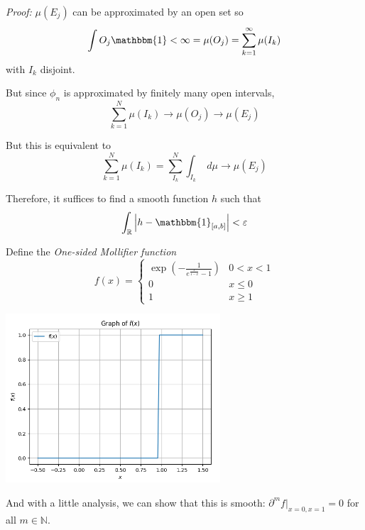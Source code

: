 \documentclass[12pt]{report}
\newcommand{\R}{\mathbb{R}}
\newcommand{\N}{\mathbb{N}}
\newcommand{\ind}{\mathbbm{1}}
\newcommand{\abs}[1]{\left\vert #1 \right\vert}
\newcommand{\ep}{\varepsilon}
\newenvironment*{tbox}[2][gray]{
    \begin{tcolorbox}[
        parbox=false,
        colback=#1!5!white,
        colframe=#1!75!black,
        breakable,
        title={#2}
    ]}
    {\end{tcolorbox}}
\begin{document}
        \begin{tbox}{\textbf{Theorem (Reduction to smooth functions in $\R$):} Let $\mu$ be the Lebesgue-Stieltjes measure on $\R$. Then $E_J$ (in the previous approximation) $\phi_n$ can be taken as a finite union of open intervals. Moreover, there exists a $C^{\infty}$ function $\phi$ that vanishes outside a bounded interval such that 
        \[\int \abs{f - \phi} \; d\mu < \ep\]}
            \emph{Proof:} $\mu(E_j)$ can be approximated by an open set so 
            \[\int{O_j} \ind < \infty = \mu(O_j) = \sum_{k=1}^\infty \mu(I_k)\]
            with $I_k$ disjoint. 

            But since $\phi_n$ is approximated by finitely many open intervals, 
            \[\sum_{k=1}^N \mu(I_k) \to \mu(O_j) \to \mu(E_j)\]
            
            But this is equivalent to 
            \[\sum_{k=1}^N \mu(I_k) = \sum_{I_k}^N \int_{I_k} \; d\mu\to \mu(E_j)\]

            Therefore, it suffices to find a smooth function $h$ such that 
            \[\int_{\R} \abs{h - \ind_{[a, b]}} < \ep\]

            Define the \emph{One-sided Mollifier function}
            \[f(x) = \begin{cases}
                \exp\left(-\frac{1}{e^{\frac{x}{1 - x}} - 1}\right) & 0 < x < 1\\ 
                0 & x \leq 0\\ 
                1 & x \geq 1
            \end{cases}\]

            \begin{center}
                \includegraphics[width=0.6\textwidth]{Images/Cinfty function.png}
            \end{center}

            And with a little analysis, we can show that this is smooth: $\partial^m f \bigg\vert_{x=0, x= 1} = 0$ for all $m \in \N$. 



\end{tbox}
\end{document}
